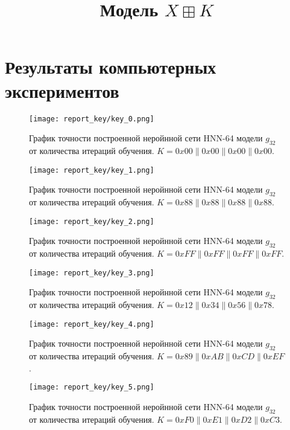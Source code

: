 \documentclass[a4paper,12pt,twoside]{article}
\begin{document}
	\title{Модель $X \boxplus K$}
	\maketitle
	
	\section{Результаты компьютерных экспериментов}
	

	\begin{figure}[htb!]
	\texttt{[image: report\_key/key\_0.png]}
	
	График точности построенной неройнной сети HNN-64 модели $g_{32}$ от количества итераций обучения.
	$K = 0x00 \| 0x00 \| 0x00 \| 0x00$.
	
	\end{figure}

\begin{figure}[htb!]
	\texttt{[image: report\_key/key\_1.png]}
	
	График точности построенной неройнной сети HNN-64 модели $g_{32}$ от количества итераций обучения.
	$K = 0x88 \| 0x88 \| 0x88 \| 0x88$.
	
\end{figure}

\begin{figure}[htb!]
	\texttt{[image: report\_key/key\_2.png]}
	
	График точности построенной неройнной сети HNN-64 модели $g_{32}$ от количества итераций обучения.
	$K = 0xFF \| 0xFF \| 0xFF \| 0xFF$.
	
\end{figure}

\begin{figure}[htb!]
	\texttt{[image: report\_key/key\_3.png]}
	
	График точности построенной неройнной сети HNN-64 модели $g_{32}$ от количества итераций обучения.
	$K = 0x12 \| 0x34 \| 0x56 \| 0x78$.
	
\end{figure}

\begin{figure}[htb!]
	\texttt{[image: report\_key/key\_4.png]}
	
	График точности построенной неройнной сети HNN-64 модели $g_{32}$ от количества итераций обучения.
	$K = 0x89 \| 0xAB \| 0xCD \| 0xEF$.
	
\end{figure}


\begin{figure}[htb!]
	\texttt{[image: report\_key/key\_5.png]}
	
	График точности построенной неройнной сети HNN-64 модели $g_{32}$ от количества итераций обучения.
	$K = 0xF0 \| 0xE1 \| 0xD2 \| 0xC3$.
	
\end{figure}

		
\end{document}

